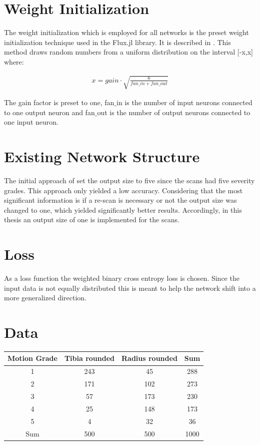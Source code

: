 \documentclass[
a4paper, 
12pt,
grayscalebody, %
abstract=on,
twoside, BCOR10mm, 12pt, DIV13,headinclude, footexclude, final, abstracton, openright
]{ibireprt}
\numberwithin{equation}{chapter}
\numberwithin{table}{chapter}
\numberwithin{figure}{chapter}
\numberwithin{algorithm}{chapter}
\numberwithin{example}{chapter}
\numberwithin{example}{chapter}
\begin{document}
\section{Weight Initialization}
The weight initialization which is employed for all networks is the preset weight initialization technique used in the Flux.jl library. It  is described in \cite{glorot2010}. This method draws random numbers from a uniform distribution on the interval [-x,x] where:

\begin{align}
	x = gain \cdot \sqrt{\frac{6}{fan\_in + fan\_out}}
\end{align}  

The gain factor is preset to one, fan$\_$in is the number of input neurons connected to one output neuron and fan$\_$out is the number of output neurons connected to one input neuron.

\section{Existing Network Structure}
The initial approach of \cite{Walle2023} set the output size to five since the scans had five severity grades. This approach only yielded a low accuracy. Considering that the most significant information is if a re-scan is necessary or not the output size was changed to one, which yielded significantly better results. Accordingly, in this thesis an output size of one is implemented for the scans.

\section{Loss}
As a loss function the weighted binary cross entropy loss is chosen. Since the input data is not equally distributed this is meant to help the network shift into a more generalized direction.

\section{Data}
\begin{center}
	\begin{tabular}{||c|c|c||c||}
		
		Motion Grade&  Tibia rounded& Radius rounded & Sum 	\\
		\hline
		\hline
		1 &  243&  45& 288   \\
		\hline
		2 &  171 & 102&  273\\
		\hline
		3 &  57&  173&  230 \\
		\hline
		4 &   25 & 148&  173 \\
		\hline
		5 &  4& 32&   36\\
		\hline
		\hline
		Sum&500&500&1000\\
		
		\hline
	\end{tabular}
\end{center}
\end{document}
